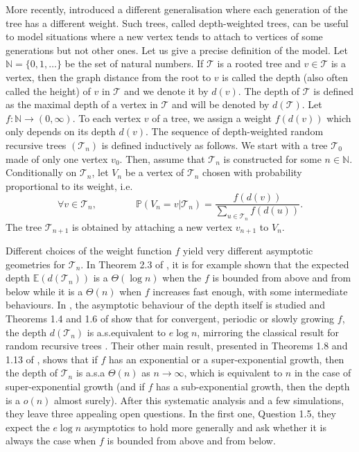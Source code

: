 \documentclass[11pt]{article}
\numberwithin{equation}{section}
\def \N{\mathbb{N}}
\def \T{\mathcal{T}}
\def\E{\mathbb{E}}
\def\P{\mathbb{P}}
\begin{document}
More recently, \cite{LMW20} introduced a different generalisation where each generation of the tree has a different weight. Such trees, called depth-weighted trees, can be useful to model situations where a new vertex tends to attach to vertices of some generations but not other ones. Let us give a precise definition of the model. Let $\N = \{0, 1, \ldots\}$ be the set of natural numbers. If $\T$ is a rooted tree and $v \in \T$ is a vertex, then the graph distance from the root to $v$ is called the depth (also often called the height) of $v$ in $\T$ and we denote it by $d(v)$. The depth of $\T$ is defined as the maximal depth of a vertex in $\T$ and will be denoted by $d(\T)$. Let $f: \N \to (0, \infty)$. To each vertex $v$ of a tree, we assign a weight $f(d(v))$ which only depends on its depth $d(v)$. The sequence of depth-weighted random recursive trees $(\T_n)$ is defined inductively as follows. We start with a tree $\T_0$ made of only one vertex $v_0$. Then, assume that $\T_n$ is constructed for some $n\in \N$. Conditionally on $\T_n$, let $V_n$ be a vertex of $\T_n$ chosen with probability proportional to its weight, i.e.
\[
\forall v \in \T_n, \qquad \qquad \P(V_n=v\vert \T_n) = \frac{f(d(v))}{\sum_{u \in \T_n} f(d(u))}.
\]
The tree $\T_{n+1}$ is obtained by attaching a new vertex $v_{n+1}$ to $V_n$.

Different choices of the weight function $f$ yield very different asymptotic geometries for $\T_n$. In Theorem 2.3 of \cite{LMW20}, it is for example shown that the expected depth $\E(d(\T_n))$ is a $\Theta(\log n)$ when the $f$ is bounded from above and from below while it is a $\Theta(n)$ when $f$ increases fast enough, with some intermediate behaviours. In \cite{LLLM26}, the asymptotic behaviour of the depth itself is studied and Theorems 1.4 and 1.6 of \cite{LLLM26} show that for convergent, periodic or slowly growing $f$, the depth $d(\T_n)$ is a.s.\@ equivalent to $e\log n$, mirroring the classical result for random recursive trees \cite{Pit94}. Their other main result, presented in Theorems 1.8 and 1.13 of \cite{LLLM26}, shows that if $f$ has an exponential or a super-exponential growth, then the depth of $\T_n$ is a.s.\@ a $\Theta(n)$ as $n\to \infty$, which is equivalent to $n$ in the case of super-exponential growth (and if $f$ has a sub-exponential growth, then the depth is a $o(n)$ almost surely). After this systematic analysis and a few simulations, they leave three appealing open questions. In the first one, Question 1.5, they expect the $e \log n$ asymptotics to hold more generally and ask whether it is always the case when $f$ is bounded from above and from below.
\end{document}
